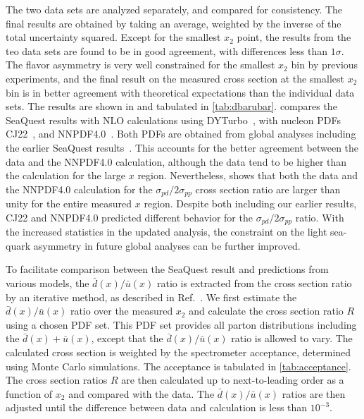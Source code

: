 \documentclass[reprint,aps,unsortedaddress,superscriptaddress,prl,floatfix,showpacs,linenumbers]{revtex4-2}
\begin{document}
The two data sets are analyzed separately, and compared for consistency.
The final results are obtained by taking an average,
weighted by the inverse of the total uncertainty squared.
Except for the smallest $x_2$ point, the results from the teo data sets are found to be in good agreement,
with differences less than $1\sigma$.
The flavor asymmetry is very well constrained for the smallest $x_2$ bin by previous experiments,
and the final result on the measured cross section at the smallest $x_2$ bin is in better agreement
with theoretical expectations than the individual data sets.
The results are shown in  and tabulated in \cref{tab:dbarubar}.
 compares the SeaQuest results with
NLO calculations using DYTurbo~\cite{camarda2020},
with nucleon PDFs  CJ22~\cite{accardi2023}, and NNPDF4.0~\cite{ball2022a}.
Both PDFs are obtained from global analyses including
the earlier SeaQuest results~\cite{dove2021}.
This accounts for the better agreement between
the data and the NNPDF4.0 calculation, although the data tend to be higher than
the calculation for the large $x$ region. 
Nevertheless, 
shows that both the data and the NNPDF4.0 calculation for the
$\sigma_{pd}/2\sigma_{pp}$ cross section ratio are larger than unity for the
entire measured $x$ region.
Despite both including our earlier results,
CJ22 and NNPDF4.0 predicted different behavior for the $\sigma_{pd}/2\sigma_{pp}$ ratio.
With the increased statistics in the updated analysis,
the constraint on the light sea-quark asymmetry in future global analyses can be further improved.

To facilitate comparison between the SeaQuest result and predictions
from various models, the $\bar{d}(x)/\bar{u}(x)$ ratio is extracted from the
cross section ratio by an iterative method, as described in
Ref.~\cite{dove2021}.
We first estimate the $\bar{d}(x)/\bar{u}(x)$ ratio over the measured $x_2$
and calculate the cross section ratio $R$ using a chosen PDF set.
This PDF set provides all parton distributions including the
$\bar{d}(x)+\bar{u}(x)$, except that the $\bar{d}(x)/\bar{u}(x)$
ratio is allowed to vary.
The calculated cross section is weighted by the spectrometer acceptance, determined using Monte Carlo simulations.
The acceptance is tabulated in \cref{tab:acceptance}.
The cross section ratios $R$ are then calculated up to next-to-leading order
as a function of $x_2$ and compared with the data. The $\bar{d}(x)/\bar{u}(x)$
ratios are then adjusted until the difference between data and
calculation is less than $10^{-3}$.
\end{document}
